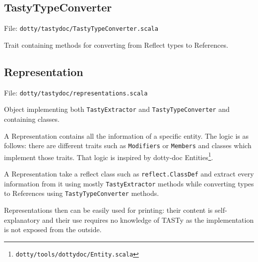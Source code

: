 \documentclass{report}
\begin{document}
\subsection{TastyTypeConverter}
File: \texttt{dotty/tastydoc/TastyTypeConverter.scala}

Trait containing methods for converting from Reflect types to References.

\subsection{Representation}
\label{sec:representation}
File: \texttt{dotty/tastydoc/representations.scala}

Object implementing both \texttt{TastyExtractor} and \texttt{TastyTypeConverter} and containing classes.

A Representation contains all the information of a specific entity. The logic is as follows: there are different traits such as \texttt{Modifiers} or \texttt{Members} and classes which implement those traits. That logic is inspired by dotty-doc Entities\footnote{\texttt{dotty/tools/dottydoc/Entity.scala}}.

A Representation take a reflect class such as \texttt{reflect.ClassDef} and extract every information from it using mostly \texttt{TastyExtractor} methods while converting types to References using \texttt{TastyTypeConverter} methods.

Representations then can be easily used for printing: their content is self-explanatory and their use requires no knowledge of TASTy as the implementation is not exposed from the outside.
\end{document}
